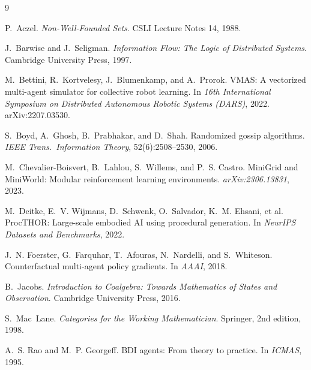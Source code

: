 \documentclass{article}
\begin{document}
{\small
\begin{thebibliography}{9}

P.~Aczel.
\newblock \emph{Non-Well-Founded Sets}.
\newblock CSLI Lecture Notes 14, 1988.

J.~Barwise and J.~Seligman.
\newblock \emph{Information Flow: The Logic of Distributed Systems}.
\newblock Cambridge University Press, 1997.

M.~Bettini, R.~Kortvelesy, J.~Blumenkamp, and A.~Prorok.
\newblock VMAS: A vectorized multi-agent simulator for collective robot learning.
\newblock In \emph{16th International Symposium on Distributed Autonomous Robotic Systems (DARS)}, 2022.
\newblock arXiv:2207.03530.

S.~Boyd, A.~Ghosh, B.~Prabhakar, and D.~Shah.
\newblock Randomized gossip algorithms.
\newblock \emph{IEEE Trans.\ Information Theory}, 52(6):2508--2530, 2006.

M.~Chevalier-Boisvert, B.~Lahlou, S.~Willems, and P.~S. Castro.
\newblock MiniGrid and MiniWorld: Modular reinforcement learning environments.
\newblock \emph{arXiv:2306.13831}, 2023.

M.~Deitke, E.~V. Wijmans, D.~Schwenk, O.~Salvador, K.~M. Ehsani, et al.
\newblock ProcTHOR: Large-scale embodied AI using procedural generation.
\newblock In \emph{NeurIPS Datasets and Benchmarks}, 2022.

J.~N. Foerster, G.~Farquhar, T.~Afouras, N.~Nardelli, and S.~Whiteson.
\newblock Counterfactual multi-agent policy gradients.
\newblock In \emph{AAAI}, 2018.

B.~Jacobs.
\newblock \emph{Introduction to Coalgebra: Towards Mathematics of States and Observation}.
\newblock Cambridge University Press, 2016.

S.~Mac~Lane.
\newblock \emph{Categories for the Working Mathematician}.
\newblock Springer, 2nd edition, 1998.

A.~S. Rao and M.~P. Georgeff.
\newblock BDI agents: From theory to practice.
\newblock In \emph{ICMAS}, 1995.


\end{thebibliography}}
\end{document}
